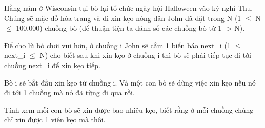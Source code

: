 Hằng năm ở Wisconsin tụi bò lại tổ chức ngày hội Halloween vào kỳ nghỉ Thu. Chúng sẽ mặc đồ hóa trang và đi xin kẹo nông dân John đã đặt trong  N (1  $\le$  N  $\le$  100,000) chuồng bò (để thuận tiện ta đánh số các chuồng  bò từ 1 -> N).  

   Để cho lũ bò chơi vui hơn, ở chuồng i John sẽ cắm 1 biển báo next\_i  (1  $\le$  next\_i  $\le$  N) cho biết sau khi xin kẹo ở chuồng i thì bò sẽ phải  tiếp tục đi tới chuồng next\_i để xin kẹo tiếp.  

   Bò i sẽ bắt đầu xin kẹo từ chuồng i. Và một con bò sẽ dừng việc xin kẹo nếu nó đi tới 1 chuồng mà nó đã từng đi qua rồi.  

   Tính xem mỗi con bò sẽ xin được bao nhiêu kẹo, biết rằng ở mỗi chuồng chúng chỉ xin được 1 viên kẹo mà thôi.